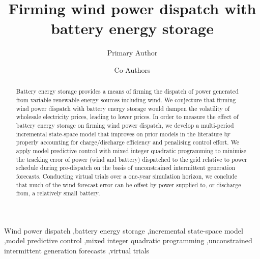 \documentclass[a4paper, 10pt, twocolumn, preprint, 3p]{elsarticle}
\begin{document}
\begin{frontmatter}

\title{Firming wind power dispatch with battery energy storage}

\author[acems]{Primary Author}

\author[acems]{Co-Authors}

\address[acems]{School of Mathematical Sciences and\\ARC Centre of Excellence for Mathematical \& Statistical Frontiers,\\The University of Adelaide, South Australia, 5005}

\begin{abstract}
Battery energy storage provides a means of firming the dispatch of power generated from variable renewable energy sources including wind.  We conjecture that firming wind power dispatch with battery energy storage would dampen the volatility of wholesale electricity prices, leading to lower prices.  In order to measure the effect of battery energy storage on firming wind power dispatch, we develop a multi-period incremental state-space model that improves on prior models in the literature by properly accounting for charge/discharge efficiency and penalising control effort.  We apply model predictive control with mixed integer quadratic programming to minimise the tracking error of power (wind and battery) dispatched to the grid relative to power schedule during pre-dispatch on the basis of unconstrained intermittent generation forecasts.  Conducting virtual trials over a one-year simulation horizon, we conclude that much of the wind forecast error can be offset by power supplied to, or discharge from, a relatively small battery.
\end{abstract}

\begin{keyword}
Wind power dispatch \sep battery energy storage \sep incremental state-space model \sep model predictive control \sep mixed integer quadratic programming \sep unconstrained intermittent generation forecasts \sep virtual trials
\end{keyword}

\end{frontmatter}
\end{document}
